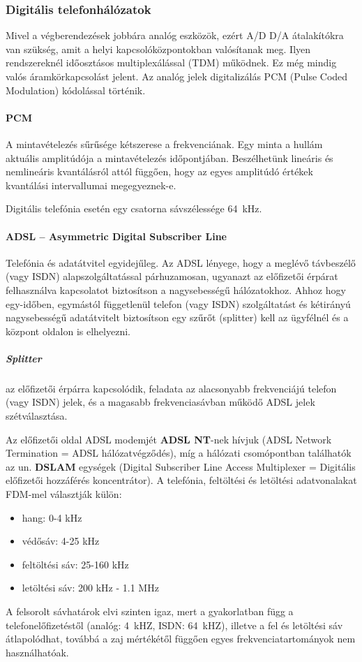 \subsubsection{Digitális telefonhálózatok}
Mivel a végberendezések jobbára analóg eszközök, ezért A/D D/A átalakítókra van szükség, amit a helyi kapcsolóközpontokban valósítanak meg. Ilyen rendszereknél időosztásos multiplexálással (TDM) működnek. Ez még mindig valós áramkörkapcsolást jelent. Az analóg jelek digitalizálás PCM (Pulse Coded Modulation) kódolással történik.

\paragraph{PCM} A mintavételezés sűrűsége kétszerese a frekvenciának. Egy minta a hullám aktuális amplitúdója a mintavételezés időpontjában. Beszélhetünk lineáris és nemlineáris kvantálásról attól függően, hogy az egyes amplitúdó értékek kvantálási intervallumai megegyeznek-e.

Digitális telefónia esetén egy csatorna sávszélessége 64~kHz.

\paragraph{ADSL -- Asymmetric Digital Subscriber Line} Telefónia és adatátvitel egyidejűleg. Az ADSL lényege, hogy a meglévő távbeszélő (vagy ISDN) alapszolgáltatással párhuzamosan, ugyanazt az előfizetői érpárat felhasználva kapcsolatot biztosítson a nagysebességű hálózatokhoz. Ahhoz hogy egy-időben, egymástól függetlenül telefon (vagy ISDN) szolgáltatást és kétirányú nagysebességű adatátvitelt biztosítson egy szűrőt (splitter) kell az ügyfélnél és a központ oldalon is elhelyezni.
\subparagraph{Splitter} az előfizetői érpárra kapcsolódik, feladata az alacsonyabb frekvenciájú telefon (vagy ISDN) jelek, és a magasabb frekvenciasávban működő ADSL jelek szétválasztása.

Az előfizetői oldal ADSL modemjét \textbf{ADSL NT}-nek hívjuk (ADSL Network Termination = ADSL hálózatvégződés), míg a hálózati csomópontban találhatók az un. \textbf{DSLAM} egységek (Digital Subscriber Line Access Multiplexer = Digitális előfizetői hozzáférés koncentrátor). A telefónia, feltöltési és letöltési adatvonalakat FDM-mel választják külön:
\begin{itemize}[nosep]
	\item hang: 0-4 kHz
	\item védősáv: 4-25 kHz
	\item feltöltési sáv: 25-160 kHz
	\item letöltési sáv: 200 kHz - 1.1 MHz
\end{itemize}
A felsorolt sávhatárok elvi szinten igaz, mert a gyakorlatban függ a telefonelőfizetéstől (analóg: 4~kHZ, ISDN: 64~kHZ), illetve a fel és letöltési sáv átlapolódhat, továbbá a zaj mértékétől függően egyes frekvenciatartományok nem használhatóak.

